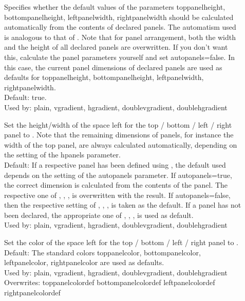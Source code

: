 \documentclass[12pt]{scrartcl}
\begin{document}
\begin{description}
 \item[]
    Specifies whether the default values of the parameters toppanelheight,
    bottompanelheight, leftpanelwidth, rightpanelwidth should be calculated
    automatically from the contents of declared panels. The automatism used
    is analogous to that of . Note that for panel
    arrangement, both the width and the height of all declared panels are
    overwritten. If you don't want this, calculate the panel parameters
    yourself and set autopanels=false. In this case, the current panel
    dimensions of declared panels are used as defaults for toppanelheight,
    bottompanelheight, leftpanelwidth, rightpanelwidth.\\
    Default: true.\\
    Used by: plain, vgradient, hgradient, doublevgradient, doublehgradient

 \item[]
    Set the height/width of the space left for the top / bottom / left / right
    panel to . Note that the remaining dimensions of panels, for
    instance the width of the top panel, are always calculated automatically,
    depending on the setting of the hpanels parameter.\\
    Default: If a respective panel has been defined using
      , the default used depends on the setting of the
      autopanels parameter. If autopanels=true, the correct dimension is
      calculated from the contents of the panel. The respective one of
      , ,
      ,  is overwritten
      with the result. If autopanels=false, then the respective setting of
      , ,
      ,  is taken as the
      default. If a panel has not been declared, the appropriate one of
      , ,
      ,  is used
      as default. \\
    Used by: plain, vgradient, hgradient, doublevgradient, doublehgradient

 \item[]
    Set the color of the space left for the top / bottom / left / right panel
    to .\\
    Default: The standard colors toppanelcolor, bottompanelcolor, leftpanelcolor,
      rightpanelcolor are used as defaults.\\
    Used by: plain, vgradient, hgradient, doublevgradient, doublehgradient\\
    Overwrites: toppanelcolordef bottompanelcolordef leftpanelcolordef
    rightpanelcolordef


\end{description}
\end{document}
